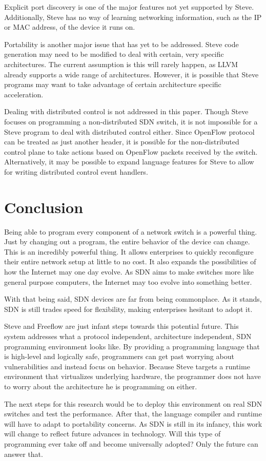 Explicit port discovery is one of the major features not yet supported by Steve. Additionally, Steve has no way of learning networking information, such as the IP or MAC address, of the device it runs on.

Portability is another major issue that has yet to be addressed. Steve code generation may need to be modified to deal with certain, very specific architectures. The current assumption is this will rarely happen, as LLVM already supports a wide range of architectures. However, it is possible that Steve programs may want to take advantage of certain architecture specific acceleration.

Dealing with distributed control is not addressed in this paper. Though Steve focuses on programming a non-distributed SDN switch, it is not impossible for a Steve program to deal with distributed control either. Since OpenFlow protocol can be treated as just another header,
it is possible for the non-distributed control plane to take actions based on OpenFlow packets received by the switch. Alternatively, it may be possible to expand language features for Steve to allow for writing distributed control event handlers.

\section{Conclusion}

Being able to program every component of a network switch is a powerful thing. Just by changing out a program, the entire behavior of the device can change. This is an incredibly powerful thing. It allows enterprises to quickly reconfigure their entire network setup at little to no cost. It also expands the possibilities of how the Internet may one day evolve. As SDN aims to make switches more like general purpose computers, the Internet may too evolve into something better.

With that being said, SDN devices are far from being commonplace. As it stands, SDN is still trades speed for flexibility, making enterprises hesitant to adopt it. 

Steve and Freeflow are just infant steps towards this potential future. This system addresses what a protocol independent, architecture independent, SDN programming environment looks like. By providing a programming language that is high-level and logically safe, programmers
can get past worrying about vulnerabilities and instead focus on behavior.
Because Steve targets a runtime environment that virtualizes underlying hardware, the programmer does not have to worry about the architecture he is programming on either.

The next steps for this research would be to deploy this environment on real SDN switches and test the performance. After that, the language compiler and runtime will have to adapt to portability concerns. As SDN is still in its infancy, this work will change to reflect future advances in technology. Will this type of programming ever take off and become universally adopted? Only the future can answer that.
